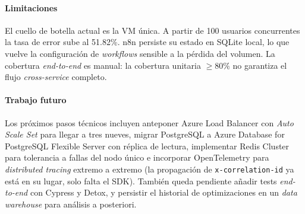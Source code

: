 \documentclass[conference]{IEEEtran}
\begin{document}
\paragraph{Limitaciones} El cuello de botella actual es la VM \'unica. A partir de 100 usuarios concurrentes la tasa de error sube al 51.82\%. n8n persiste su estado en SQLite local, lo que vuelve la configuraci\'on de \emph{workflows} sensible a la p\'erdida del volumen. La cobertura \emph{end-to-end} es manual: la cobertura unitaria $\geq 80\%$ no garantiza el flujo \emph{cross-service} completo.

\paragraph{Trabajo futuro} Los pr\'oximos pasos t\'ecnicos incluyen anteponer Azure Load Balancer con \emph{Auto Scale Set} para llegar a tres nueves, migrar PostgreSQL a Azure Database for PostgreSQL Flexible Server con r\'eplica de lectura, implementar Redis Cluster para tolerancia a fallas del nodo \'unico e incorporar OpenTelemetry para \emph{distributed tracing} extremo a extremo (la propagaci\'on de \texttt{x-correlation-id} ya est\'a en su lugar, solo falta el SDK). Tambi\'en queda pendiente a\~nadir tests \emph{end-to-end} con Cypress y Detox, y persistir el historial de optimizaciones en un \emph{data warehouse} para an\'alisis a posteriori.
\end{document}
